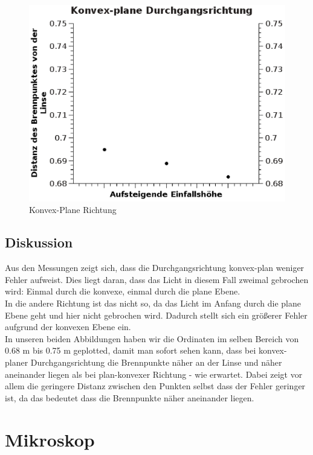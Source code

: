 \documentclass{article}
\begin{document}
\begin{center}
\begin{figure}
\caption{Konvex-Plane Richtung}
\includegraphics[scale=0.7]{graph2.eps}
\end{figure}
\end{center}
\subsection{Diskussion}
Aus den Messungen zeigt sich, dass die Durchgangsrichtung konvex-plan weniger Fehler aufweist. Dies liegt daran, dass das Licht in diesem Fall zweimal gebrochen wird: Einmal durch die konvexe, einmal durch die plane Ebene. \\
In die andere Richtung ist das nicht so, da das Licht im Anfang durch die plane Ebene geht und hier nicht gebrochen wird. Dadurch stellt sich ein größerer Fehler aufgrund der konvexen Ebene ein. \\
In unseren beiden Abbildungen haben wir die Ordinaten im selben Bereich von 0.68 m bis 0.75 m geplotted, damit man sofort sehen kann, dass bei konvex-planer Durchgangsrichtung die Brennpunkte näher an der Linse und näher aneinander liegen als bei plan-konvexer Richtung - wie erwartet. Dabei zeigt vor allem die geringere Distanz zwischen den Punkten selbst dass der Fehler geringer ist, da das bedeutet dass die Brennpunkte näher aneinander liegen. 



\section{Mikroskop}
\end{document}
